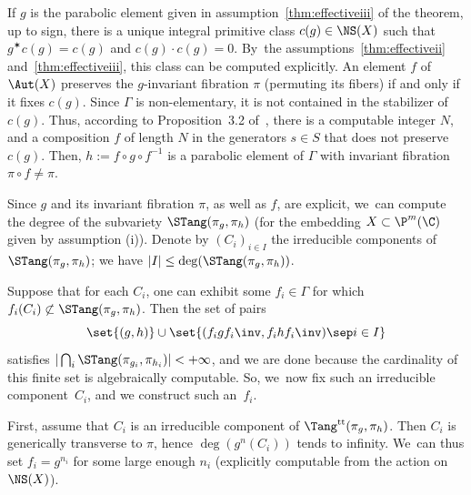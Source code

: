 If $g$ is the parabolic element given in assumption~\eqref{thm:effectiveiii} of the theorem, up to sign, there is a unique integral primitive class $c(g)\in \NS(X)$ such that $g^\varstar c(g)=c(g)$ and $c(g)\cdot c(g)=0$. By~the assumptions~\eqref{thm:effectiveii} and~\eqref{thm:effectiveiii}, this class can be computed explicitly. An element $f$ of $\Aut(X)$ preserves the $g$-invariant fibration $\pi$ (permuting its fibers) if and only if it fixes $c(g)$. Since $\Gamma$ is non-elementary, it is not contained in the stabilizer of $c(g)$. Thus, according to Proposition~3.2 of~\cite{eskin-mozes-oh}, there is a computable integer $N$, and a composition $f$ of length $N$ in the generators $s\in S$ that does not preserve $c(g)$. Then, $h:= f\circ g \circ f^{-1}$ is a parabolic element of $\Gamma$ with invariant fibration $\pi\circ f\neq \pi$.

Since $g$ and its invariant fibration $\pi$, as well as $f$, are explicit, we~can compute the degree of the subvariety
$\STang(\pi_g, \pi_h)$ (for the embedding $X\subset \P^m(\C)$ given by assumption (i)). Denote by $(C_i)_{i\in I}$ the irreducible components of $\STang(\pi_g, \pi_h)$; we have $\vert I\vert \leq \deg(\STang(\pi_g, \pi_h))$.

Suppose that for each $C_i$, one can exhibit some $f_i\in \Gamma$ for which $f_i(C_i)\not \subset \STang(\pi_g, \pi_h)$. Then the set of pairs
\begin{equation*}
\set{(g,h)} \cup \set{ (f_igf_i\inv, f_i h f_i\inv)\sep  i\in I}
\end{equation*}
satisfies $\vert \bigcap_i\STang(\pi_{g_i}, \pi_{h_i})\vert < +\infty$, and we are done because the cardinality of this finite set is algebraically computable.
So, we~now fix such an irreducible component~$C_i$, and we construct such an~$f_i$.

First, assume that $C_i$ is an irreducible component of $\Tang^{\mathrm{tt}}(\pi_g, \pi_h)$. Then $C_i$ is generically transverse to $\pi$, hence $\deg(g^n(C_i))$ tends to infinity. We~can thus set \hbox{$f_i=g^{n_i}$} for some large enough $n_i$ (explicitly computable from the action on $\NS(X)$).

